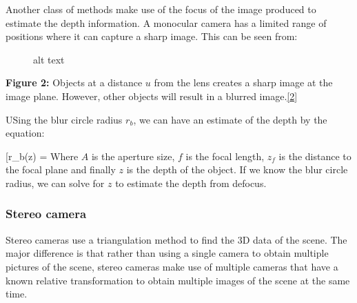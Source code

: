 Another class of methods make use of the focus of the image produced to
estimate the depth information. A monocular camera has a limited range
of positions where it can capture a sharp image. This can be seen from:

\begin{figure}
\centering
{}
\caption{alt text}
\end{figure}

\textbf{Figure 2:} Objects at a distance \(u\) from the lens creates a
sharp image at the image plane. However, other objects will result in a
blurred
image.\href{https://www.researchgate.net/publication/273947737/figure/fig8/AS:650806445473802@1532175756521/Depth-defocus-relationship-The-same-object-point-placed-at-different-distances-will-be.png}{{[}2{]}}

USing the blur circle radius \(r_b\), we can have an estimate of the
depth by the equation:

{[}r\_b(z) = \frac{f}{z_f-f}{]} Where \(A\) is the
aperture size, \(f\) is the focal length, \(z_f\) is the distance to the
focal plane and finally \(z\) is the depth of the object. If we know the
blur circle radius, we can solve for \(z\) to estimate the depth from
defocus.

\subsubsection{Stereo camera}\label{stereo-camera}

Stereo cameras use a triangulation method to find the 3D data of the
scene. The major difference is that rather than using a single camera to
obtain multiple pictures of the scene, stereo cameras make use of
multiple cameras that have a known relative transformation to obtain
multiple images of the scene at the same time.

